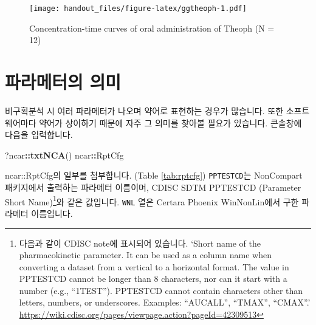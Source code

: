 \documentclass[9pt,]{krantz}
\newenvironment{Shaded}{\begin{snugshade}}{\end{snugshade}}
\newcommand{\KeywordTok}[1]{\textcolor[rgb]{0.13,0.29,0.53}{\textbf{#1}}}
\newcommand{\OperatorTok}[1]{\textcolor[rgb]{0.81,0.36,0.00}{\textbf{#1}}}
\newcommand{\NormalTok}[1]{#1}
\begin{document}
\begin{figure}
\centering
\texttt{[image: handout\_files/figure-latex/ggtheoph-1.pdf]}
\caption{\label{fig:ggtheoph}Concentration-time curves of oral
administration of Theoph (N = 12)}
\end{figure}

\section{파라메터의 의미}\label{-}

비구획분석 시 여러 파라메터가 나오며 약어로 표현하는 경우가 많습니다.
또한 소프트웨어마다 약어가 상이하기 때문에 자주 그 의미를 찾아볼 필요가
있습니다. 콘솔창에 다음을 입력합니다.

\begin{Shaded}
\begin{Highlighting}[]
\NormalTok{?ncar}\OperatorTok{::}\KeywordTok{txtNCA}\NormalTok{()}
\NormalTok{ncar}\OperatorTok{::}\NormalTok{RptCfg}
\end{Highlighting}
\end{Shaded}

ncar::RptCfg의 일부를 첨부합니다. (Table \ref{tab:rptcfg})
\texttt{PPTESTCD}는 NonCompart 패키지에서 출력하는 파라메터 이름이며,
CDISC SDTM PPTESTCD (Parameter Short Name)\footnote{다음과 같이 CDISC
  note에 표시되어 있습니다. `Short name of the pharmacokinetic
  parameter. It can be used as a column name when converting a dataset
  from a vertical to a horizontal format. The value in PPTESTCD cannot
  be longer than 8 characters, nor can it start with a number (e.g.,
  ``1TEST''). PPTESTCD cannot contain characters other than letters,
  numbers, or underscores. Examples: ``AUCALL'', ``TMAX'', ``CMAX''.'
  \url{https://wiki.cdisc.org/pages/viewpage.action?pageId=42309513}}와
같은 값입니다. \texttt{WNL} 열은 Certara Phoenix WinNonLin에서 구한
파라메터 이름입니다.
\end{document}
